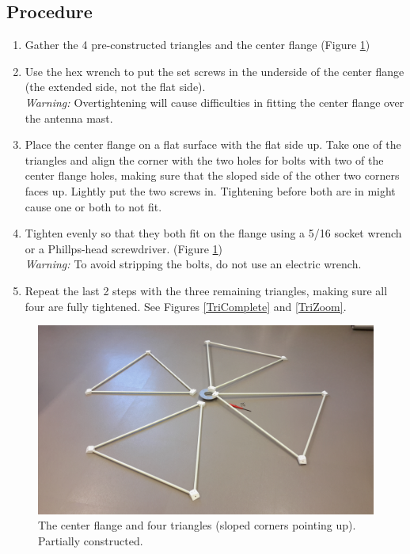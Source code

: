 \documentclass[12pt]{article}
\begin{document}
\begin{enumerate}
	\subsection{Procedure}
		\begin{enumerate}
			\item Gather the 4 pre-constructed triangles and the center flange (Figure \ref{TriHalfDone})
			\item Use the hex wrench to put the set screws in the underside of the center flange (the extended side, not the flat side). \\ \emph{Warning: \bf}Overtightening will cause difficulties in fitting the center flange over the antenna mast.
			\item Place the center flange on a flat surface with the flat side up. Take one of the triangles and align the corner with the two holes for bolts with two of the center flange holes, making sure that the sloped side of the other two corners faces up. Lightly put the two screws in. Tightening before both are in might cause one or both to not fit.
			\item Tighten evenly so that they both fit on the flange using a 5/16 socket wrench or a Phillps-head screwdriver. (Figure \ref{TriHalfDone}) \\ \emph{Warning: \bf}To avoid stripping the bolts, do not use an electric wrench.
			\item Repeat the last 2 steps with the three remaining triangles, making sure all four are fully tightened. See Figures \ref{TriComplete} and \ref{TriZoom}.

		\end{enumerate}

\begin{figure}[!hp]
  \center
     \includegraphics[width=\linewidth]{plots/20141125_095619.jpg}
     \caption{The center flange and four triangles (sloped corners pointing up). Partially constructed. \label{TriHalfDone}}
\end{figure}


\end{enumerate}
\end{document}
